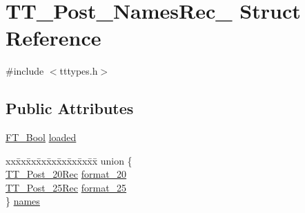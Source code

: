 \hypertarget{struct_t_t___post___names_rec__}{\section{T\-T\-\_\-\-Post\-\_\-\-Names\-Rec\-\_\- Struct Reference}
\label{struct_t_t___post___names_rec__}
}


{\ttfamily \#include $<$tttypes.\-h$>$}

\subsection*{Public Attributes}
\begin{DoxyCompactItemize}
\item 
\hyperlink{fttypes_8h_a1a832a256bb5a7e6e884afaa1a07f3ae}{F\-T\-\_\-\-Bool} \hyperlink{struct_t_t___post___names_rec___a8878ac4555c3df60958869f0d53383c9}{loaded}
\item 
\begin{tabbing}
xx\=xx\=xx\=xx\=xx\=xx\=xx\=xx\=xx\=\kill
union \{\\
\>\hyperlink{tttypes_8h_ae04863b448871f40c72817c16816b85a}{TT\_Post\_20Rec} \hyperlink{struct_t_t___post___names_rec___a72f5c635f0b9aa4c7115ef959d82b481}{format\_20}\\
\>\hyperlink{tttypes_8h_a6e7d9f8a0c32fa4dc4f78b6086522f4b}{TT\_Post\_25Rec} \hyperlink{struct_t_t___post___names_rec___ae8d289766a901d9af02d0a889d110186}{format\_25}\\
\} \hyperlink{struct_t_t___post___names_rec___a833df0c14836e44c9f148a713443af8e}{names}\\

\end{tabbing}\end{DoxyCompactItemize}


